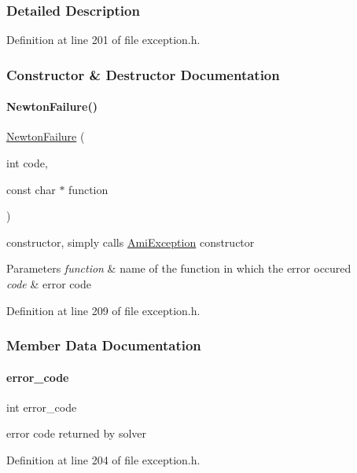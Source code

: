 \subsubsection{Detailed Description}


Definition at line 201 of file exception.\+h.



\subsubsection{Constructor \& Destructor Documentation}
\mbox{\label{classamici_1_1_newton_failure_abb7a5bc514c646f2411344f71c2f7e6f}} 
\paragraph{\texorpdfstring{Newton\+Failure()}{NewtonFailure()}}
{\footnotesize\ttfamily \mbox{\hyperlink{classamici_1_1_newton_failure}{Newton\+Failure}} (\begin{DoxyParamCaption}\item[{int}]{code,  }\item[{const char $\ast$}]{function }\end{DoxyParamCaption})}

constructor, simply calls \mbox{\hyperlink{classamici_1_1_ami_exception}{Ami\+Exception}} constructor 
\begin{DoxyParams}{Parameters}
{\em function} & name of the function in which the error occured \\
\hline
{\em code} & error code \\
\hline
\end{DoxyParams}


Definition at line 209 of file exception.\+h.



\subsubsection{Member Data Documentation}
\mbox{\label{classamici_1_1_newton_failure_a7d16b1c68c87cec009d972e79abfba78}} 
\paragraph{\texorpdfstring{error\+\_\+code}{error\_code}}
{\footnotesize\ttfamily int error\+\_\+code}

error code returned by solver 

Definition at line 204 of file exception.\+h.

